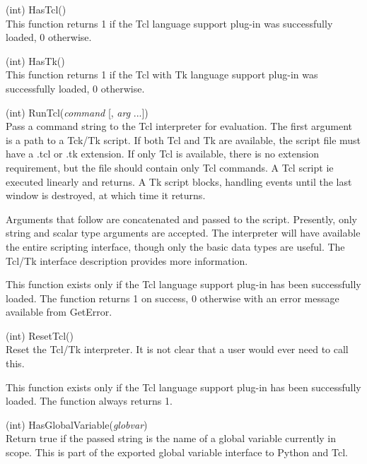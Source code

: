 \begin{description}
\item{(int) \vt HasTcl()}\\
This function returns 1 if the Tcl language support plug-in was
successfully loaded, 0 otherwise.

\item{(int) \vt HasTk()}\\
This function returns 1 if the Tcl with Tk language support plug-in
was successfully loaded, 0 otherwise.

\item{(int) \vt RunTcl({\it command\/} [, {\it arg} ...])}\\
Pass a command string to the Tcl interpreter for evaluation.  The
first argument is a path to a Tck/Tk script.  If both Tcl and Tk are
available, the script file must have a {\vt .tcl} or {\vt .tk}
extension.  If only Tcl is available, there is no extension
requirement, but the file should contain only Tcl commands.  A Tcl
script ie executed linearly and returns.  A Tk script blocks, handling
events until the last window is destroyed, at which time it returns.

Arguments that follow are concatenated and passed to the script. 
Presently, only string and scalar type arguments are accepted.  The
interpreter will have available the entire {\Xic} scripting interface,
though only the basic data types are useful.  The Tcl/Tk interface
description provides more information.

This function exists only if the Tcl language support plug-in has been
successfully loaded.  The function returns 1 on success, 0 otherwise
with an error message available from {\vt GetError}.

\item{(int) \vt ResetTcl()}\\
Reset the Tcl/Tk interpreter.  It is not clear that a user would ever
need to call this.

This function exists only if the Tcl language support plug-in has been
successfully loaded.  The function always returns 1.

\item{(int) \vt HasGlobalVariable({\it globvar\/})}\\
Return true if the passed string is the name of a global variable
currently in scope.  This is part of the exported global variable
interface to Python and Tcl.


\end{description}

